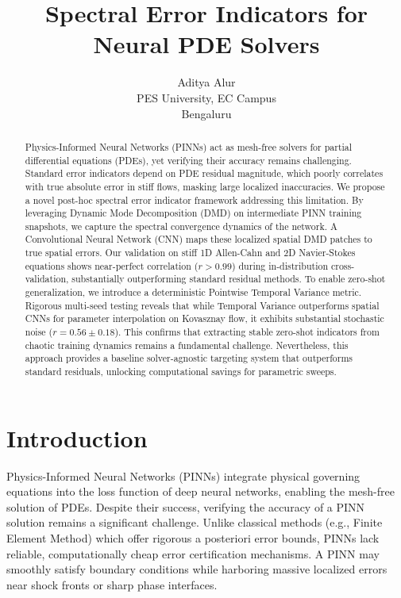 \documentclass{article}
\title{Spectral Error Indicators for Neural PDE Solvers}
\author{
  Aditya Alur \\
  PES University, EC Campus \\
  Bengaluru
}
\begin{document}
\maketitle


\begin{abstract}
Physics-Informed Neural Networks (PINNs) act as mesh-free solvers for partial differential equations (PDEs), yet verifying their accuracy remains challenging. Standard error indicators depend on PDE residual magnitude, which poorly correlates with true absolute error in stiff flows, masking large localized inaccuracies. We propose a novel post-hoc spectral error indicator framework addressing this limitation. By leveraging Dynamic Mode Decomposition (DMD) on intermediate PINN training snapshots, we capture the spectral convergence dynamics of the network. A Convolutional Neural Network (CNN) maps these localized spatial DMD patches to true spatial errors. Our validation on stiff 1D Allen-Cahn and 2D Navier-Stokes equations shows near-perfect correlation ($r > 0.99$) during in-distribution cross-validation, substantially outperforming standard residual methods. To enable zero-shot generalization, we introduce a deterministic Pointwise Temporal Variance metric. Rigorous multi-seed testing reveals that while Temporal Variance outperforms spatial CNNs for parameter interpolation on Kovasznay flow, it exhibits substantial stochastic noise ($r=0.56 \pm 0.18$). This confirms that extracting stable zero-shot indicators from chaotic training dynamics remains a fundamental challenge. Nevertheless, this approach provides a baseline solver-agnostic targeting system that outperforms standard residuals, unlocking computational savings for parametric sweeps.
\end{abstract}


\section{Introduction}
Physics-Informed Neural Networks (PINNs) integrate physical governing equations into the loss function of deep neural networks, enabling the mesh-free solution of PDEs. Despite their success, verifying the accuracy of a PINN solution remains a significant challenge. Unlike classical methods (e.g., Finite Element Method) which offer rigorous a posteriori error bounds, PINNs lack reliable, computationally cheap error certification mechanisms. A PINN may smoothly satisfy boundary conditions while harboring massive localized errors near shock fronts or sharp phase interfaces.
\end{document}
